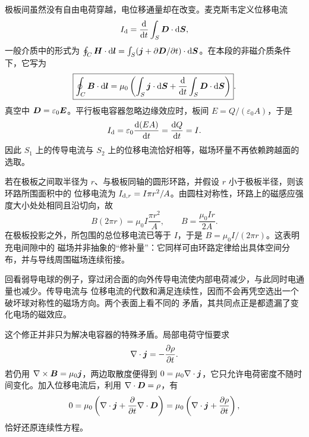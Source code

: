 {极板间虽然没有自由电荷穿越，电位移通量却在改变。麦克斯韦定义位移电流
\begin{equation}
  I_{\rm d}=\frac{\mathop{}\!\mathrm d}{\mathop{}\!\mathrm d t}\int_S\bm{D}\cdot\mathop{}\!\mathrm d\bm{S},
\end{equation}
一般介质中的形式为 $\oint_C\bm{H}\cdot\mathop{}\!\mathrm d\bm{l}=\int_S(\bm{j}+\partial\bm{D}/\partial t)\cdot\mathop{}\!\mathrm d\bm{S}$。在本段的非磁介质条件下，它写为
\begin{equation}
  \boxed{\oint_C\bm{B}\cdot\mathop{}\!\mathrm d\bm{l}
  =\mu_0\left(\int_S\bm{j}\cdot\mathop{}\!\mathrm d\bm{S}
  +\frac{\mathop{}\!\mathrm d}{\mathop{}\!\mathrm d t}\int_S\bm{D}\cdot\mathop{}\!\mathrm d\bm{S}\right)}.
\end{equation}
真空中 $\bm{D}=\varepsilon_0\bm{E}$。平行板电容器忽略边缘效应时，板间
$E=Q/(\varepsilon_0 A)$，于是
\begin{equation}
  I_{\rm d}=\varepsilon_0\frac{\mathop{}\!\mathrm d(EA)}{\mathop{}\!\mathrm d t}
  =\frac{\mathop{}\!\mathrm d Q}{\mathop{}\!\mathrm d t}=I.
\end{equation}
因此 $S_1$ 上的传导电流与 $S_2$ 上的位移电流恰好相等，磁场环量不再依赖跨越面的选取。

若在极板之间取半径为 $r$、与极板同轴的圆形环路，并假设 $r$ 小于极板半径，则该环路所围面积中的
位移电流为 $I_{{\rm d},r}=I\pi r^2/A$。由圆柱对称性，环路上的磁感应强度大小处处相同且沿切向，故
\begin{equation}
  B(2\pi r)=\mu_0I\frac{\pi r^2}{A},
  \qquad B=\frac{\mu_0Ir}{2A}.
\end{equation}
在极板投影之外，所包围的总位移电流已等于 $I$，于是 $B=\mu_0I/(2\pi r)$。这表明充电间隙中的
磁场并非抽象的“修补量”：它同样可由环路定律给出具体空间分布，并与导线周围磁场连续衔接。

回看弱导电球的例子，穿过闭合面的向外传导电流使内部电荷减少，与此同时电通量也减少。传导电流与
位移电流的代数和满足连续性，因而不会再凭空选出一个破坏球对称性的磁场方向。两个表面上看不同的
矛盾，其共同点正是都遗漏了变化电场的磁效应。

这个修正并非只为解决电容器的特殊矛盾。局部电荷守恒要求
\begin{equation}
  \nabla\cdot\bm{j}=-\frac{\partial\rho}{\partial t}.
\end{equation}
若仍用 $\nabla\times\bm{B}=\mu_0\bm{j}$，两边取散度便得到
$0=\mu_0\nabla\cdot\bm{j}$，它只允许电荷密度不随时间变化。加入位移电流后，利用
$\nabla\cdot\bm{D}=\rho$，有
\begin{equation}
  0=\mu_0\left(\nabla\cdot\bm{j}+
  \frac{\partial}{\partial t}\nabla\cdot\bm{D}\right)
  =\mu_0\left(\nabla\cdot\bm{j}+\frac{\partial\rho}{\partial t}\right),
\end{equation}
恰好还原连续性方程。

}
